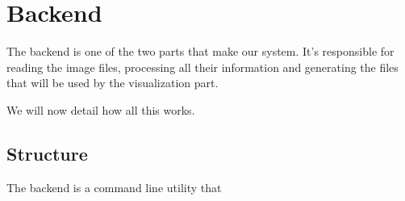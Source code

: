 \section{Backend}
\label{sec:backend}

The backend is one of the two parts that make our system. It’s responsible for reading the image files, processing all their information and generating the files that will be used by the visualization part.

We will now detail how all this works.

\subsection{Structure}
\label{sub:Structure}

The backend is a command line utility that 




